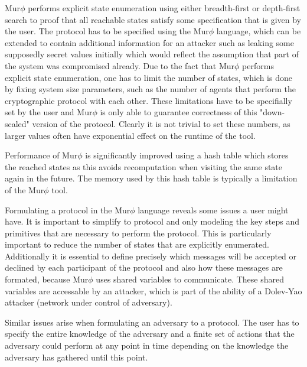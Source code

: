 \documentclass[a4paper,UKenglish]{lipics-v2018}
\def\murphi{Mur$\phi$ }
\begin{document}
\murphi performs explicit state enumeration using either breadth-first or depth-first search to proof that all reachable states satisfy some specification that is given by the user. The protocol has to be specified using the \murphi language, which can be extended to contain additional information for an attacker such as leaking some supposedly secret values initially which would reflect the assumption that part of the system was compromised already. Due to the fact that \murphi performs explicit state enumeration, one has to limit the number of states, which is done by fixing system size parameters, such as the number of agents that perform the cryptographic protocol with each other. These limitations have to be specifially set by the user and \murphi is only able to guarantee correctness of this "down-scaled" version of the protocol. Clearly it is not trivial to set these numbers, as larger values often have exponential effect on the runtime of the tool.\cite{murphi}

Performance of \murphi is significantly improved using a hash table which stores the reached states as this avoids recomputation when visiting the same state again in the future. The memory used by this hash table is typically a limitation of the \murphi tool.\cite{murphi}

Formulating a protocol in the \murphi language reveals some issues a user might have. It is important to simplify to protocol and only modeling the key steps and primitives that are necessary to perform the protocol. This is particularly important to reduce the number of states that are explicitly enumerated. Additionally it is essential to define precisely which messages will be accepted or declined by each participant of the protocol and also how these messages are formated, because \murphi uses shared variables to communicate. These shared variables are accessable by an attacker, which is part of the ability of a Dolev-Yao attacker (network under control of adversary).\cite{murphi}

Similar issues arise when formulating an adversary to a protocol. The user has to specify the entire knowledge of the adversary and a finite set of actions that the adversary could perform at any point in time depending on the knowledge the adversary has gathered until this point.\cite{murphi}

\end{document}
